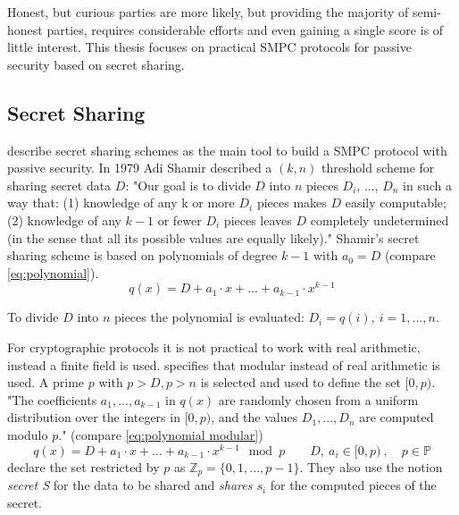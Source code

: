 		Honest, but curious parties are more likely, but providing the majority of semi-honest parties, requires considerable efforts and even gaining a single score is of little interest. This thesis focuses on practical \gls{SMPC} protocols for passive security based on secret sharing.

		\subsection{Secret Sharing}
		\label{Secret Sharing}
		
		\textcite[p. 32]{Cramer2015} describe secret sharing schemes as the main tool to build a \gls{SMPC} protocol with passive security. In 1979 Adi Shamir described a $(k, n)$ threshold scheme for sharing secret data $D$: "Our goal is to divide $D$ into $n$ pieces $D_i$, ..., $D_n$ in such a way that:
		(1) knowledge of any k or more $D_i$ pieces makes $D$ easily computable; (2) knowledge of any $k-1$ or fewer $D_i$ pieces leaves $D$ completely undetermined (in the sense that all its possible values are equally likely)." \autocite{Shamir1979}
		Shamir's secret sharing scheme is based on polynomials of degree $k-1$ with $a_0=D$ (compare \ref{eq:polynomial}). 
		\begin{equation}
		\label{eq:polynomial}
		q(x)=D + a_1 \cdot x + ... + a_{k-1} \cdot x^{k-1}
		\end{equation}
		
		To divide $D$ into $n$ pieces the polynomial is evaluated: $D_i=q(i),\ i=1,...,n$.
		
		For cryptographic protocols it is not practical to work with real arithmetic, instead a finite field is used. \textcite{Shamir1979} specifies that modular instead of real arithmetic is used. A prime $p$ with $p>D, p>n$ is selected and used to define the set $[0, p)$. "The coefficients $a_1, ..., a_{k-1}$ in $q(x)$ are randomly chosen	from a uniform distribution over the integers in $[0, p)$, and the values $D_1, ..., D_n$ are computed modulo $p$." \autocite[p. 613]{Shamir1979} (compare \ref{eq:polynomial modular})
		\begin{equation}
		\label{eq:polynomial modular}
		q(x) = D + a_1 \cdot x + ... + a_{k-1} \cdot x^{k-1} \mod p \qquad D,\ a_i \in [0,p)\ , \quad p \in \mathbb{P}
		\end{equation}
		\textcite[p. 7]{Cramer2015} declare the set restricted by $p$ as $\mathbb{Z}_p = \{0, 1, ..., p-1\}$. They also use the notion \textit{secret S} for the data to be shared and \textit{shares $s_i$} for the computed pieces of the secret.
		
